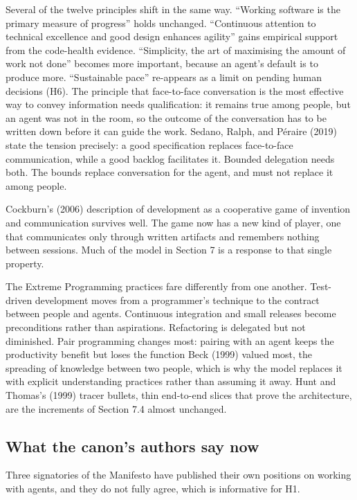 \documentclass[11pt]{article}
\begin{document}
Several of the twelve principles shift in the same way. ``Working software is the primary measure of progress'' holds unchanged. ``Continuous attention to technical excellence and good design enhances agility'' gains empirical support from the code-health evidence. ``Simplicity, the art of maximising the amount of work not done'' becomes more important, because an agent's default is to produce more. ``Sustainable pace'' re-appears as a limit on pending human decisions (H6). The principle that face-to-face conversation is the most effective way to convey information needs qualification: it remains true among people, but an agent was not in the room, so the outcome of the conversation has to be written down before it can guide the work. Sedano, Ralph, and P\'eraire (2019) state the tension precisely: a good specification replaces face-to-face communication, while a good backlog facilitates it. Bounded delegation needs both. The bounds replace conversation for the agent, and must not replace it among people.

Cockburn's (2006) description of development as a cooperative game of invention and communication survives well. The game now has a new kind of player, one that communicates only through written artifacts and remembers nothing between sessions. Much of the model in Section 7 is a response to that single property.

The Extreme Programming practices fare differently from one another. Test-driven development moves from a programmer's technique to the contract between people and agents. Continuous integration and small releases become preconditions rather than aspirations. Refactoring is delegated but not diminished. Pair programming changes most: pairing with an agent keeps the productivity benefit but loses the function Beck (1999) valued most, the spreading of knowledge between two people, which is why the model replaces it with explicit understanding practices rather than assuming it away. Hunt and Thomas's (1999) tracer bullets, thin end-to-end slices that prove the architecture, are the increments of Section 7.4 almost unchanged.

\subsection{What the canon's authors say now}

Three signatories of the Manifesto have published their own positions on working with agents, and they do not fully agree, which is informative for H1.
\end{document}
